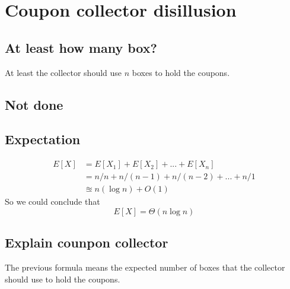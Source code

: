 \documentclass{article}
\begin{document}
\section{Coupon collector disillusion}
\subsection{At least how many box?}
At least the collector should use $n$ boxes to hold the coupons.
\subsection{Not done }
\subsection{Expectation}
\begin{align}
E[X] &= E[X_1] + E[X_2]+ ... + E[X_n]\\
&= n/n + n/(n-1) + n/(n-2) + ... + n/1 \\
&\approxeq n(\log n ) + O(1) 
\end{align}
So we could conclude that 
\[
	E[X] = \Theta(n\log n)
\]
\subsection{Explain counpon collector}
The previous formula means the expected number of boxes that the collector should use to hold the coupons.
\end{document}
